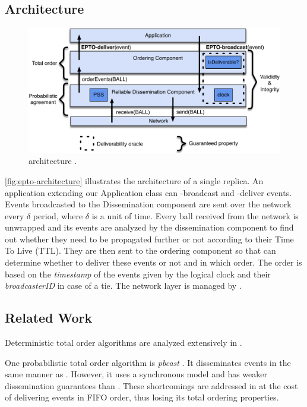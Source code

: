 \subsection{\epto Architecture}
\begin{figure}[htp]
	\includegraphics[width=\linewidth]{figures/architecture.pdf}
	\caption{\epto architecture \autocite{matos2015epto}.}
	\label{fig:epto-architecture}
\end{figure}
\autoref{fig:epto-architecture} illustrates the architecture of a single \epto replica. An application extending our Application class can \epto-broadcast and \epto-deliver events. Events broadcasted to the Dissemination component are sent over the network every $\delta$ period, where $\delta$ is a unit of time. Every ball received from the network is unwrapped and its events are analyzed by the dissemination component to find out whether they need to be propagated further or not according to their Time To Live (TTL). They are then sent to the ordering component so that \epto can determine whether to deliver these events or not and in which order. The order is based on the \textit{timestamp} of the events given by the logical clock and their \textit{broadcasterID} in case of a tie. The network layer is managed by \eptotester.
\subsection{Related Work}
Deterministic total order algorithms are analyzed extensively in \autocite{defago2004total}.

One probabilistic total order algorithm is \textit{pbcast} \autocite{pbcast1996}. It disseminates events in the same manner as \epto. However, it uses a synchronous model and has weaker dissemination guarantees than \epto. These shortcomings are addressed in \autocite{birman1999bimodal} at the cost of delivering events in FIFO order, thus losing its total ordering properties.

